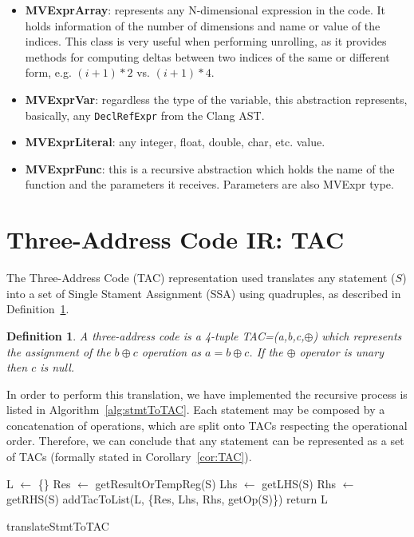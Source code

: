 \documentclass[a4paper,12pt]{memoir}
\newtheorem{definition}{Definition}[]
\begin{document}
\begin{itemize}
	\item \textbf{MVExprArray}: represents any N-dimensional expression in the
	      code. It
	      holds information of the number of dimensions and name or value of the
	      indices. This class is very useful when performing unrolling, as it 
	      provides methods for computing deltas between two indices of the same 
	      or different form, e.g. $(i+1)*2$ vs. $(i+1)*4$.
	\item \textbf{MVExprVar}: regardless the type of the variable, this
	      abstraction
	      represents, basically, any \texttt{DeclRefExpr} from the Clang AST.
	\item \textbf{MVExprLiteral}: any integer, float, double, char, etc. value.
	\item \textbf{MVExprFunc}: this is a recursive abstraction which holds the
	      name of the function and the parameters it receives. Parameters are also
	      MVExpr
	      type.
\end{itemize}

\section{Three-Address Code IR: TAC}
The Three-Address Code (TAC) representation used translates any statement ($S$)
into a
set of Single Stament Assignment (SSA) using quadruples, as described in
Definition~\ref{def:TAC}.

\theoremstyle{definition}
\begin{definition}\label{def:TAC}
	A three-address code is a 4-tuple TAC=(a,b,c,$\oplus$) which represents the
	assignment of the $b \oplus c$ operation as $a
		=
		b \oplus c$. If the $\oplus$ operator is unary then $c$ is null.
\end{definition}

In order to perform this translation, we have implemented the recursive process
is listed in
Algorithm~\ref{alg:stmtToTAC}. Each statement may be composed by a
concatenation of operations, which are split onto TACs respecting the
operational order. Therefore, we can conclude that any statement
can be represented as a set of TACs (formally stated in
Corollary~\ref{cor:TAC}).

\begin{algorithm}[H]\label{alg:stmtToTAC}
	\SetAlgoLined
	L $\leftarrow$ \{\}\;
	Res $\leftarrow$ getResultOrTempReg(S)\;
	Lhs $\leftarrow$ getLHS(S)\;
	Rhs $\leftarrow$ getRHS(S)\;
	addTacToList(L, \{Res, Lhs, Rhs, getOp(S)\})\;
	return L\;
	\caption{translateStmtToTAC}
\end{algorithm}
\end{document}
